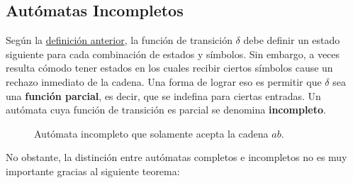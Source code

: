 \subsection{Autómatas Incompletos}

Según la \hyperref[subsec-definicion-afds]{definición anterior}, la función de transición $\delta$ debe definir un estado siguiente para cada combinación de estados y símbolos. Sin embargo, a veces resulta cómodo tener estados en los cuales recibir ciertos símbolos cause un rechazo inmediato de la cadena. Una forma de lograr eso es permitir que $\delta$ sea una \textbf{función parcial}, es decir, que se indefina para ciertas entradas. Un autómata cuya función de transición es parcial se denomina \textbf{incompleto}.

\begin{figure}[H]
    \centering
    \caption*{Autómata incompleto que solamente acepta la cadena $ab$.}
\end{figure}

No obstante, la distinción entre autómatas completos e incompletos no es muy importante gracias al siguiente teorema:


